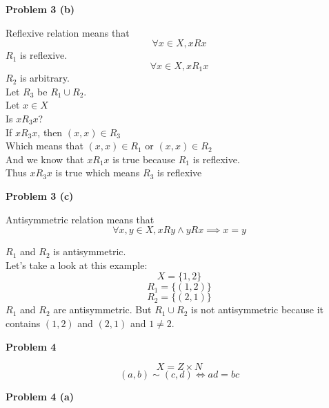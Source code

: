 \documentclass{article}
\begin{document}
\begin{flushleft}
   \textbf{\large Problem 3 (b)}
\end{flushleft}

Reflexive relation means that
\[
   \forall x \in X, xRx
\]
$R_1$ is reflexive.
\[
   \forall x \in X, xR_1x
\]
$R_2$ is arbitrary. \\
Let $R_3$ be $R_1 \cup R_2$. \\
Let $x \in X$ \\
Is $xR_3x$? \\
If $xR_3x$, then $(x, x) \in R_3$ \\
Which means that $(x, x) \in R_1$ or $(x, x) \in R_2$ \\
And we know that $xR_1x$ is true because $R_1$ is reflexive. \\
Thus $xR_3x$ is true which means $R_3$ is reflexive \\


\begin{flushleft}
   \textbf{\large Problem 3 (c)}
\end{flushleft}

Antisymmetric relation means that
\[
   \forall x, y \in X, xRy \land yRx \implies x = y
\]

$R_1$ and $R_2$ is antisymmetric. \\
Let's take a look at this example: \\
\[
   X = \{1, 2\}
\]
\[
   R_1 = \{(1, 2)\}
\]
\[
   R_2 = \{(2, 1)\}
\]
$R_1$ and $R_2$ are antisymmetric. But $R_1 \cup R_2$ is not antisymmetric because it contains $(1, 2)$ and $(2, 1)$ and $1 \not= 2$. \\


\begin{flushleft}
   \textbf{\Large Problem 4}
\end{flushleft}

\[X = Z \times N\]
\[
   (a, b) \sim (c, d) \iff ad = bc
\]

\begin{flushleft}
   \textbf{\large Problem 4 (a)}
\end{flushleft}
\end{document}
